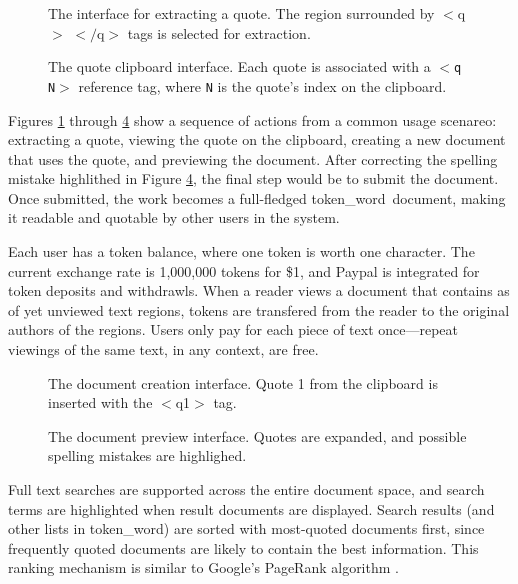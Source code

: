 \documentclass{acm_proc_article-sp}
\newcommand{\tw}{token\_word}
\begin{document}
\begin{figure}[t]
\centering
{}
\caption{The interface for extracting a quote.  The region surrounded by $<$q$>$ $<$$/$q$>$ tags is selected for extraction.}
\label{fig:extractQuote}
\end{figure}

\begin{figure}[t]
\centering
{}
\caption{The quote clipboard interface.  Each quote is associated with a $<$\texttt{q N}$>$ reference tag, where \texttt{N} is the quote's index on the clipboard.}
\label{fig:quoteClipboard}
\end{figure}

Figures \ref{fig:extractQuote} through \ref{fig:docPreview} show a sequence of actions from a common usage scenareo:  extracting a quote, viewing the quote on the clipboard, creating a new document that uses the quote, and previewing the document.
After correcting the spelling mistake highlithed in Figure \ref{fig:docPreview}, the final step would be to submit the document.
Once submitted, the work becomes a full-fledged \tw \  document, making it readable and quotable by other users in the system.


Each user has a token balance, where one token is worth one character.
The current exchange rate is 1,000,000 tokens for \$1, and Paypal is integrated for token deposits and withdrawls.
When a reader views a document that contains as of yet unviewed text regions, tokens are transfered from the reader to the original authors of the regions.
Users only pay for each piece of text once---repeat viewings of the same text, in any context, are free.
\begin{figure}[t]
\centering
{}
\caption{The document creation interface. Quote 1 from the clipboard is inserted with the $<$q1$>$ tag.}
\label{fig:docCreate}
\end{figure}

\begin{figure}[t]
\centering
{}
\caption{The document preview interface.  Quotes are expanded, and possible spelling mistakes are highlighed.}
\label{fig:docPreview}
\end{figure}

Full text searches are supported across the entire document space, and search terms are highlighted when result documents are displayed.
Search results (and other lists in \tw) are sorted with most-quoted documents first, since frequently quoted documents are likely to contain the best information.
This ranking mechanism is similar to Google's PageRank algorithm \cite{Brin1998}. 
\end{document}
